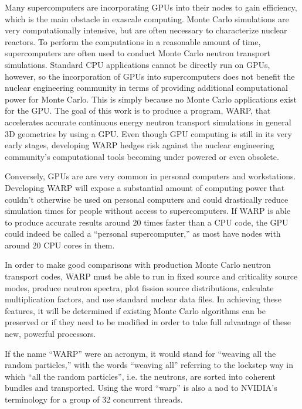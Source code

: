 Many supercomputers are incorporating GPUs into their nodes to gain efficiency, which is the main obstacle in exascale computing.  Monte Carlo simulations are very computationally intensive, but are often necessary to characterize nuclear reactors.  To perform the computations in a reasonable amount of time, supercomputers are often used to conduct Monte Carlo neutron transport simulations.  Standard CPU applications cannot be directly run on GPUs, however, so the incorporation of GPUs into supercomputers does not benefit the nuclear engineering community in terms of providing additional computational power for Monte Carlo.  This is simply because no Monte Carlo applications exist for the GPU.  The goal of this work is to produce a program, WARP, that accelerates accurate continuous energy neutron transport simulations in general 3D geometries by using a GPU.  Even though GPU computing is still in its very early stages, developing WARP hedges risk against the nuclear engineering community's computational tools becoming under powered or even obsolete.

Conversely, GPUs are are very common in personal computers and workstations.  Developing WARP will expose a substantial amount of  computing power that couldn't otherwise be used on personal computers and could drastically reduce simulation times for people without access to supercomputers.  If WARP is able to produce accurate results around 20 times faster than a CPU code, the GPU could indeed be called a ``personal supercomputer,'' as most have nodes with around 20 CPU cores in them.   

In order to make good comparisons with production Monte Carlo neutron transport codes, WARP must be able to run in fixed source and criticality source modes, produce neutron spectra, plot fission source distributions, calculate multiplication factors, and use standard nuclear data files.  In achieving these features, it will be determined if existing Monte Carlo algorithms can be preserved or if they need to be modified in order to take full advantage of these new, powerful processors.  

If the name ``WARP'' were an acronym, it would stand for ``weaving all the random particles,'' with the words ``weaving all'' referring to the lockstep way in which ``all the random particles'', i.e. the neutrons, are sorted into coherent bundles and transported.  Using the word ``warp'' is also a nod to NVIDIA's terminology for a group of 32 concurrent threads.

